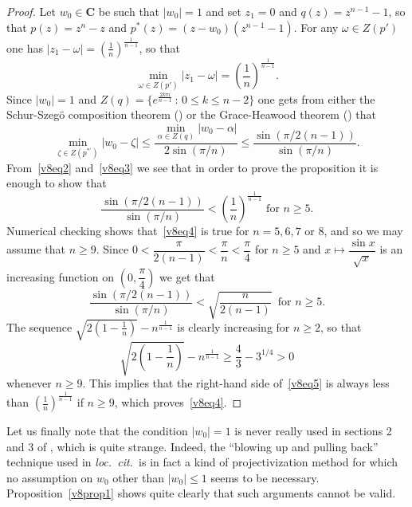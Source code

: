\documentclass[10pt,twoside,a4paper,reqno]{amsart}
\theoremstyle{plain}
\theoremstyle{definition}
\begin{document}
{\begin{proof}
Let $w_{0}\in \mathbf{C}$ be such that $|w_0|=1$ and set $z_1=0$ and 
$q(z)=z^{n-1}-1$, so that $p(z)=z^n-z$ and 
$p^{*}(z)=(z-w_0)(z^{n-1}-1)$. For any $\omega\in Z(p')$ one has
$|z_1-\omega|=\left(\frac{1}{n}\right)^{\frac{1}{n-1}}$, so that
\begin{equation}\label{v8eq2}
\min_{\omega\in Z(p')}|z_1-\omega|=\left(\frac{1}{n}\right)^{\frac{1}{n-1}}.
\end{equation}
Since $|w_0|=1$ and $Z(q)=\{e^{\frac{2k\pi i}{n-1}}\,:\,0\le k\le n-2\}$ one 
gets from either the Schur-Szeg\"o composition theorem 
(\cite[Theorem 3.4.1d]{RS}) or the Grace-Heawood theorem 
(\cite[Theorem 4.3.1]{RS}) that
\begin{equation}\label{v8eq3}
\min_{\zeta\in Z(p^{*'})}|w_0-\zeta|\le \frac{\min_{\alpha\in Z(q)}
|w_0-\alpha|}{2\sin(\pi/n)}\le \frac{\sin\left(\pi/2(n-1)\right)}{\sin(\pi/n)}.
\end{equation}
From~\eqref{v8eq2} and~\eqref{v8eq3} we see that in order to prove the 
proposition it is enough to show that
\begin{equation}\label{v8eq4}
\frac{\sin\left(\pi/2(n-1)\right)}{\sin(\pi/n)}
< \left(\frac{1}{n}\right)^{\frac{1}{n-1}}\text{ for }n\ge 5.
\end{equation}
Numerical checking shows that~\eqref{v8eq4} is true for $n=5,6,7$ or 8, and so 
we may assume that $n\ge 9$. Since 
$0<\dfrac{\pi}{2(n-1)}<\dfrac{\pi}{n}<\dfrac{\pi}{4}$ for $n\ge 5$ and 
$x\mapsto \dfrac{\sin x}{\sqrt{x}}$ is an 
increasing function on $\left(0,\dfrac{\pi}{4}\right)$ we get that
\begin{equation}\label{v8eq5}
\frac{\sin\left(\pi/2(n-1)\right)}{\sin(\pi/n)}<\sqrt{\frac{n}{2(n-1)}}
\,\text{ for }n\ge 5.
\end{equation}
The sequence $\sqrt{2\left(1-\frac{1}{n}\right)}-n^{\frac{1}{n-1}}$ is clearly 
increasing for $n\ge 2$, so that 
$$\sqrt{2\left(1-\frac{1}{n}\right)}-n^{\frac{1}{n-1}}\ge 
\frac{4}{3}-3^{1/4}>0$$ 
whenever $n\ge 9$. This implies that the right-hand side of~\eqref{v8eq5} is 
always less than $\left(\frac{1}{n}\right)^{\frac{1}{n-1}}$ if $n\ge 9$, which 
proves~\eqref{v8eq4}. 
\end{proof}

Let us finally note that the condition $|w_0|=1$ is never really used in 
sections 2 and 3 of \cite[v8]{S1}, which is quite strange. Indeed, 
the ``blowing up and pulling back'' technique used in {\em loc.~cit.~}is 
in fact a kind of projectivization method for which no assumption on $w_0$ 
other than $|w_0|\le 1$ seems to be necessary. Proposition~\ref{v8prop1} 
shows quite clearly that such arguments cannot be valid. 

}
\end{document}
